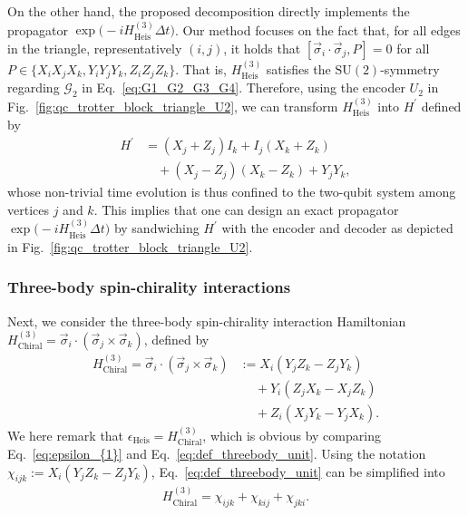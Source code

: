 \documentclass[aps,showpacs,amsmath,amssymb,twocolumn,prx,longbibliography,superscriptaddress,notitlepage,floatfix,10pt]{revtex4-2}
\begin{document}
On the other hand, the proposed decomposition directly implements the propagator $\exp\bigl(-iH_{\mathrm{Heis}}^{(3)}\Delta t\bigr)$.
Our method focuses on the fact that, for all edges in the triangle, representatively $(i, j)$, it holds that $[\vec{\sigma}_{i}\cdot\vec{\sigma}_{j}, P]=0$ for all $P\in\{X_{i}X_{j}X_{k}, Y_{i}Y_{j}Y_{k}, Z_{i}Z_{j}Z_{k}\}$.
That is, $H_{\mathrm{Heis}}^{(3)}$ satisfies the $\mathrm{SU}(2)$-symmetry regarding $\mathcal{G}_{2}$ in Eq.~\eqref{eq:G1_G2_G3_G4}.
Therefore, using the encoder $U_{2}$ in Fig.~\ref{fig:qc_trotter_block_triangle_U2}, we can transform $H_{\mathrm{Heis}}^{(3)}$ into $H^{\prime}$ defined by
\begin{equation}
\begin{split}
    H^{\prime}
    &= (X_{j}+Z_{j}) I_{k} + I_{j} (X_{k}+Z_{k}) \\
    &\quad+ (X_{j}-Z_{j}) (X_{k}-Z_{k}) + Y_{j}Y_{k},
\end{split}
\end{equation}
whose non-trivial time evolution is thus confined to the two-qubit system among vertices $j$ and $k$.
This implies that one can design an exact propagator $\exp\bigl(-iH_{\mathrm{Heis}}^{(3)}\Delta t\bigr)$ by sandwiching $H^{\prime}$ with the encoder and decoder as depicted in Fig.~\ref{fig:qc_trotter_block_triangle_U2}.


\subsubsection{Three-body spin-chirality interactions}

Next, we consider the three-body spin-chirality interaction Hamiltonian $H_{\mathrm{Chiral}}^{(3)} = \vec{\sigma}_{i} \cdot (\vec{\sigma}_{j} \times \vec{\sigma}_{k})$, defined by
\begin{equation}
\begin{split}\label{eq:def_threebody_unit}
    H_{\mathrm{Chiral}}^{(3)} = \vec{\sigma}_{i} \cdot (\vec{\sigma}_{j} \times \vec{\sigma}_{k}) 
    &:= X_{i}(Y_{j}Z_{k} - Z_{j}Y_{k}) \\
    &\quad~ + Y_{i}(Z_{j}X_{k} - X_{j}Z_{k}) \\
    &\quad~ + Z_{i}(X_{j}Y_{k} - Y_{j}X_{k}).
\end{split}
\end{equation}
We here remark that $\epsilon_{\mathrm{Heis}} = H_{\mathrm{Chiral}}^{(3)}$, which is obvious by comparing Eq.~\eqref{eq:epsilon_{1}} and Eq.~\eqref{eq:def_threebody_unit}.
Using the notation $\chi_{ijk}:=X_{i}(Y_{j}Z_{k}-Z_{j}Y_{k})$, Eq.~\eqref{eq:def_threebody_unit} can be simplified into
\begin{equation}
\begin{split}
    H_{\mathrm{Chiral}}^{(3)} = \chi_{ijk} + \chi_{kij} + \chi_{jki}.
\end{split}
\end{equation}
\end{document}

